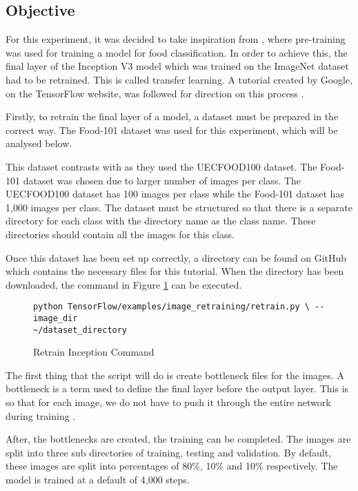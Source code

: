 \tocless\subsection{Objective}
For this experiment, it was decided to take inspiration from
\parencite{yanaiFood}, where pre-training was used for training a model for food
classification. In order to achieve this, the final layer of the
Inception V3 model which was trained on the ImageNet dataset had to be retrained. This is called
transfer learning.
A tutorial created by Google, on the TensorFlow website, was followed
for direction on this process \parencite{retrainInception}.

Firstly, to retrain the final layer of a model, a dataset must be
prepared in the correct way. The Food-101 dataset \parencite{food101}
was used for this experiment, which will be analysed below.

This dataset contrasts with \parencite{yanaiFood} as they used the UECFOOD100 dataset.
The Food-101 dataset was chosen due to larger number of images per class.
The UECFOOD100 dataset has 100 images per class while the Food-101 dataset has 1,000 images per class.
The dataset must be structured so that
there is a separate directory for each class with the directory name as the class
name. These directories should contain all the images for this class. 

Once this dataset has been set up correctly, a directory can be found on GitHub
which contains the necessary files for this tutorial. When the directory has
been downloaded, the command in Figure \ref{lst:retrainCommand} can be executed.
\begin{figure}
\caption{Retrain Inception Command}
\label{lst:retrainCommand}
\begin{lstlisting}[style=Command]
python TensorFlow/examples/image_retraining/retrain.py \ --image_dir
~/dataset_directory
\end{lstlisting}
\end{figure}

The first thing that the script will do is create bottleneck files for the
images. A bottleneck is a term used to define the final layer before the output
layer. This is so that for each image, we do not have to push it through the
entire network during training \parencite{retrainInception}.

After, the bottlenecks are created, the training can be completed. The images
are split into three sub directories of training, testing and validation. By
default, these images are split into percentages of 80\%, 10\% and 10\%
respectively. The model is trained at a default of 4,000 steps. 


